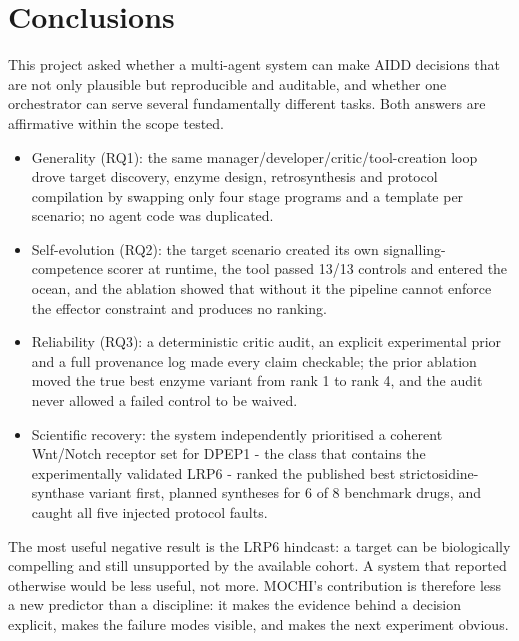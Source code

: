 \chapter{Conclusions}\label{ch:5}

This project asked whether a multi-agent system can make AIDD decisions that are not only plausible but reproducible and auditable, and whether one orchestrator can serve several fundamentally different tasks. Both answers are affirmative within the scope tested.

\begin{itemize}
\setlength{\itemsep}{0pt}\setlength{\parskip}{0pt}
\item Generality (RQ1): the same manager/developer/critic/tool-creation loop drove target discovery, enzyme design, retrosynthesis and protocol compilation by swapping only four stage programs and a template per scenario; no agent code was duplicated.
\item Self-evolution (RQ2): the target scenario created its own signalling-competence scorer at runtime, the tool passed 13/13 controls and entered the ocean, and the ablation showed that without it the pipeline cannot enforce the effector constraint and produces no ranking.
\item Reliability (RQ3): a deterministic critic audit, an explicit experimental prior and a full provenance log made every claim checkable; the prior ablation moved the true best enzyme variant from rank 1 to rank 4, and the audit never allowed a failed control to be waived.
\item Scientific recovery: the system independently prioritised a coherent Wnt/Notch receptor set for DPEP1 - the class that contains the experimentally validated LRP6 - ranked the published best stric\-to\-si\-dine-synthase variant first, planned syntheses for 6 of 8 benchmark drugs, and caught all five injected protocol faults.
\end{itemize}

The most useful negative result is the LRP6 hindcast: a target can be biologically compelling and still unsupported by the available cohort. A system that reported otherwise would be less useful, not more. MOCHI's contribution is therefore less a new predictor than a discipline: it makes the evidence behind a decision explicit, makes the failure modes visible, and makes the next experiment obvious.

